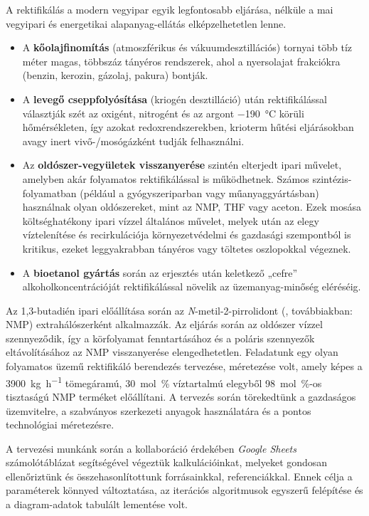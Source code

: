 A rektifikálás a modern vegyipar egyik legfontosabb eljárása, nélküle
a mai vegyipari és energetikai alapanyag-ellátás elképzelhetetlen lenne.

\begin{itemize}
  \item A \textbf{kőolajfinomítás} (atmoszférikus és
    vákuumdesztillációs) tornyai több tíz méter magas, többszáz
    tányéros rendszerek, ahol a nyersolajat frakciókra (benzin,
    kerozin, gázolaj, pakura) bontják.
  \item A \textbf{levegő cseppfolyósítása} (kriogén desztilláció)
    után rektifikálással választják szét az oxigént, nitrogént és az
    argont \qty{-190}{\degreeCelsius} körüli hőmérsékleten, így
    azokat redoxrendszerekben, krioterm hűtési eljárásokban avagy
    inert vivő-/mosógázként tudják felhasználni.
  \item Az \textbf{oldószer-vegyületek visszanyerése} szintén
    elterjedt ipari művelet, amelyben akár folyamatos rektifikálással
    is működhetnek. Számos szintézis-folyamatban (például a
    gyógyszeriparban vagy műanyaggyártásban) használnak olyan
    oldószereket, mint az NMP, THF vagy aceton. Ezek mosása
    költséghatékony ipari vízzel általános  művelet, melyek után az
    elegy víztelenítése és recirkulációja környezetvédelmi és
    gazdasági szempontból is kritikus, ezeket leggyakrabban tányéros
    vagy töltetes oszlopokkal végeznek.
  \item A \textbf{bioetanol gyártás} során az erjesztés után
    keletkező „cefre” alkoholkoncentrációját rektifikálással növelik
    az üzemanyag-minőség eléréséig.
\end{itemize}

Az 1,3-butadién ipari előállítása során az
\emph{N}-metil-2-pirrolidont (, továbbiakban: NMP)
extrahálószerként alkalmazzák. Az eljárás során az oldószer vízzel
szennyeződik, így a körfolyamat fenntartásához és a poláris
szennyezők eltávolításához az NMP visszanyerése elengedhetetlen.
Feladatunk egy olyan folyamatos üzemű rektifikáló berendezés
tervezése, méretezése volt, amely képes a \qty{3900}{\kg\per\hour}
tömegáramú, \qty{30}{\mole\percent} víztartalmú elegyből
\qty{98}{\mole\percent}-os tisztaságú NMP terméket előállítani. A
tervezés során törekedtünk a gazdaságos üzemvitelre, a szabványos
szerkezeti anyagok használatára és a pontos technológiai méretezésre.

A tervezési munkánk során a kollaboráció érdekében \emph{Google
Sheets} számolótáblázat segítségével végeztük kalkulációinkat,
melyeket gondosan ellenőriztünk és összehasonlítottunk forrásainkkal,
referenciákkal. Ennek célja a paraméterek könnyed változtatása, az
iterációs algoritmusok egyszerű felépítése és a diagram-adatok
tabulált lementése volt.

